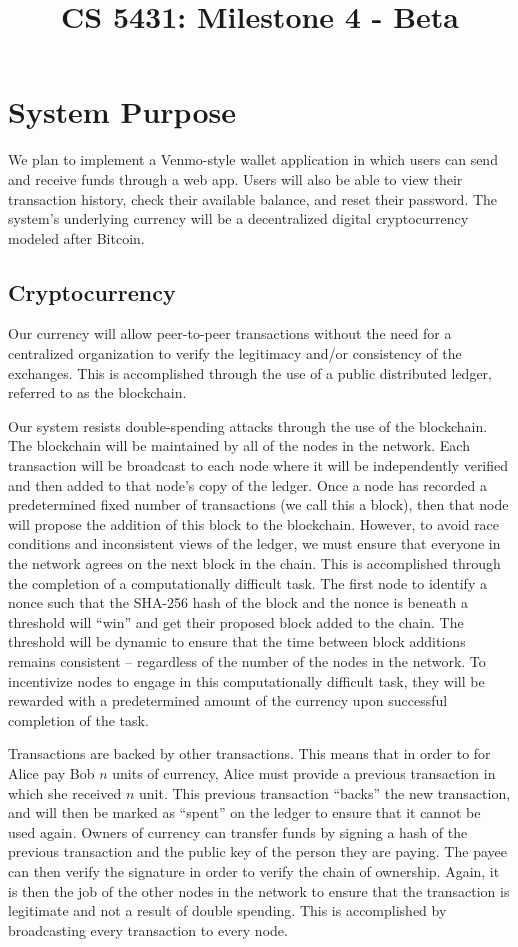 \documentclass[12pt]{article}
\title{CS 5431: Milestone 4 - Beta}
\author{
\iam{James Cassell}{jcc384}
\and
\iam{Evan King}{esk79}
\and
\iam{Ethan Koenig}{etk39}
\and
\iam{Eric Perdew}{ecp84}
\and
\iam{Will Ronchetti}{wrr33}
}
\begin{document}
\maketitle

\section{System Purpose}

We plan to implement a Venmo-style wallet application in which users can send and receive funds through a web app. Users will also be able to view their transaction history, check their available balance, and reset their password. The system's underlying currency will be a decentralized digital cryptocurrency modeled after Bitcoin.

\subsection*{Cryptocurrency}

Our currency will allow peer-to-peer transactions without the need for a centralized organization to verify the legitimacy and/or consistency of the exchanges.  This is accomplished through the use of a public distributed ledger, referred to as the blockchain.

Our system resists double-spending attacks through the use of the blockchain. The blockchain will be maintained by all of the nodes in the network. Each transaction will be broadcast to each node where it will be independently verified and then added to that node's copy of the ledger. Once a node has recorded a predetermined fixed number of transactions (we call this a block), then that node will propose the addition of this block to the blockchain. However, to avoid race conditions and inconsistent views of the ledger, we must ensure that everyone in the network agrees on the next block in the chain. This is accomplished through the completion of a computationally difficult task. The first node to identify a nonce such that the SHA-256 hash of the block and the nonce is beneath a threshold will ``win'' and get their proposed block added to the chain. The threshold will be dynamic to ensure that the time between block additions remains consistent -- regardless of the number of the nodes in the network.  To incentivize nodes to engage in this computationally difficult task, they will be rewarded with a predetermined amount of the currency upon successful completion of the task.

Transactions are backed by other transactions. This means that in order to for Alice pay Bob $n$ units of currency, Alice must provide a previous transaction in which she received $n$ unit. This previous transaction ``backs'' the new transaction, and will then be marked as ``spent'' on the ledger to ensure that it cannot be used again. Owners of currency can transfer funds by signing a hash of the previous transaction and the public key of the person they are paying. The payee can then verify the signature in order to verify the chain of ownership. Again, it is then the job of the other nodes in the network to ensure that the transaction is legitimate and not a result of double spending. This is accomplished by broadcasting every transaction to every node.
\end{document}
